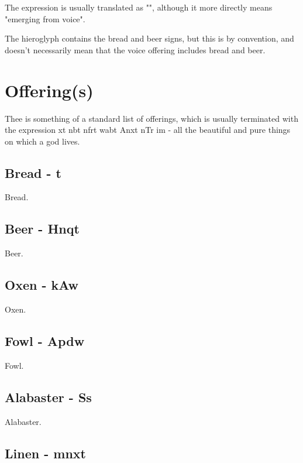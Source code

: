 The expression  is usually translated as "", although it more directly means "emerging from voice".

The hieroglyph contains the bread and beer signs, but this is by convention, and doesn't necessarily mean that the voice offering includes bread and beer.

\section*{Offering(s)}

Thee is something of a standard list of offerings, which is usually terminated with the expression xt nbt nfrt wabt Anxt nTr im - all the beautiful and pure things on which a god lives.

\subsection*{Bread - t}

Bread.

\subsection*{Beer - Hnqt}

Beer.

\subsection*{Oxen - kAw}

Oxen.

\subsection*{Fowl - Apdw}

Fowl.

\subsection*{Alabaster - Ss}

Alabaster.

\subsection*{Linen - mnxt}

